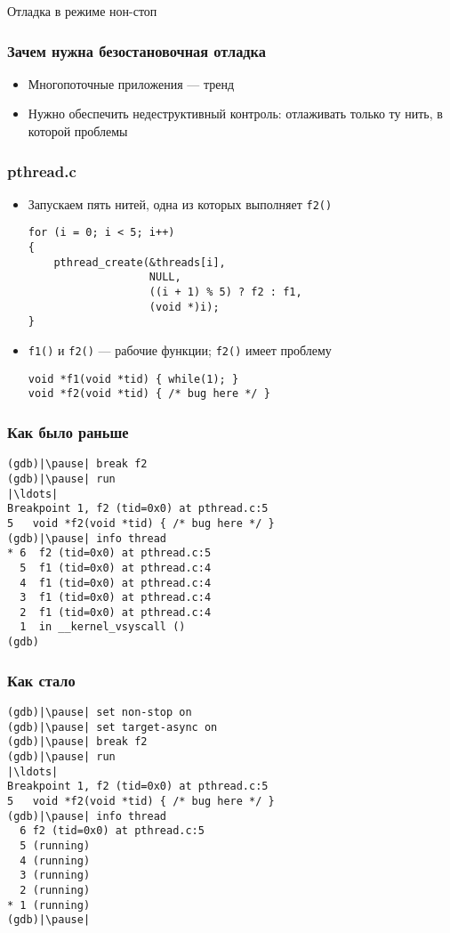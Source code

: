 \documentclass[onlymath]{beamer}
\newcommand\code\texttt
\begin{document}
\begin{subsection}{Отладка в режиме нон-стоп}
\begin{frame}
  \frametitle{Зачем нужна безостановочная отладка}
  \begin{itemize}
  \item Многопоточные приложения — тренд
  \item Нужно обеспечить недеструктивный контроль: отлаживать только
    ту нить, в которой проблемы
  \end{itemize}
\end{frame}

\begin{frame}[fragile]
  \frametitle{pthread.c}
  \begin{itemize}
  \item Запускаем пять нитей, одна из которых выполняет \code{f2()}
\begin{lstlisting}
for (i = 0; i < 5; i++)
{
    pthread_create(&threads[i],
                   NULL, 
                   ((i + 1) % 5) ? f2 : f1, 
                   (void *)i);
}
\end{lstlisting}
\item \code{f1()} и \code{f2()} — рабочие функции; \code{f2()} имеет проблему
\begin{lstlisting}
void *f1(void *tid) { while(1); }
void *f2(void *tid) { /* bug here */ }
\end{lstlisting}
  \end{itemize}
\end{frame}

\begin{frame}[fragile]
  \frametitle{Как было раньше}
\begin{lstlisting}[style=gdbsession]
(gdb)|\pause| break f2
(gdb)|\pause| run
|\ldots|
Breakpoint 1, f2 (tid=0x0) at pthread.c:5
5	void *f2(void *tid) { /* bug here */ }
(gdb)|\pause| info thread
* 6  f2 (tid=0x0) at pthread.c:5
  5  f1 (tid=0x0) at pthread.c:4
  4  f1 (tid=0x0) at pthread.c:4
  3  f1 (tid=0x0) at pthread.c:4
  2  f1 (tid=0x0) at pthread.c:4
  1  in __kernel_vsyscall ()
(gdb)
\end{lstlisting}
\end{frame}

\begin{frame}[fragile]
  \frametitle{Как стало}
\begin{lstlisting}[style=gdbsession]
(gdb)|\pause| set non-stop on
(gdb)|\pause| set target-async on
(gdb)|\pause| break f2
(gdb)|\pause| run
|\ldots|
Breakpoint 1, f2 (tid=0x0) at pthread.c:5
5	void *f2(void *tid) { /* bug here */ }
(gdb)|\pause| info thread
  6 f2 (tid=0x0) at pthread.c:5
  5 (running)
  4 (running)
  3 (running)
  2 (running)
* 1 (running)
(gdb)|\pause|
\end{lstlisting}
\end{frame}


\end{subsection}
\end{document}
